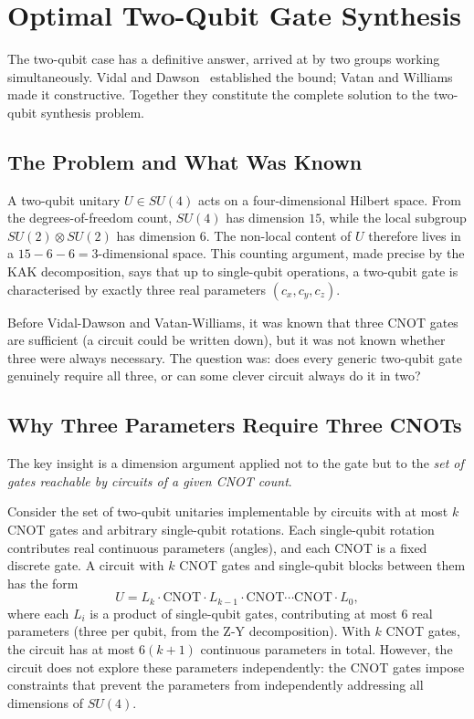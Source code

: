 \documentclass[12pt, a4paper, oneside]{report}
\theoremstyle{plain}
\theoremstyle{definition}
\theoremstyle{remark}
\newcommand{\CNOT}{\mathrm{CNOT}}
\begin{document}

\section{Optimal Two-Qubit Gate Synthesis}
\label{sec:two-qubit-opt}

The two-qubit case has a definitive answer, arrived at by two groups working
simultaneously. Vidal and Dawson~\cite{vidal2004} established the bound; Vatan and
Williams~\cite{vatan2004} made it constructive. Together they constitute the complete
solution to the two-qubit synthesis problem.

\subsection{The Problem and What Was Known}

A two-qubit unitary $U \in SU(4)$ acts on a four-dimensional Hilbert space. From the
degrees-of-freedom count, $SU(4)$ has dimension $15$, while the local subgroup
$SU(2) \otimes SU(2)$ has dimension $6$. The non-local content of $U$ therefore lives in a
$15 - 6 - 6 = 3$-dimensional space. This counting argument, made precise by the KAK
decomposition, says that up to single-qubit operations, a two-qubit gate
is characterised by exactly three real parameters $(c_x, c_y, c_z)$.

Before Vidal-Dawson and Vatan-Williams, it was known that three CNOT gates are sufficient
(a circuit could be written down), but it was not known whether three were always necessary.
The question was: does every generic two-qubit gate genuinely require all three, or can
some clever circuit always do it in two?

\subsection{Why Three Parameters Require Three CNOTs}

The key insight is a dimension argument applied not to the gate but to the \emph{set of
	gates reachable by circuits of a given CNOT count}.

Consider the set of two-qubit unitaries implementable by circuits with at most $k$ CNOT
gates and arbitrary single-qubit rotations. Each single-qubit rotation contributes real
continuous parameters (angles), and each CNOT is a fixed discrete gate. A circuit with
$k$ CNOT gates and single-qubit blocks between them has the form
\[
	U = L_k \cdot \CNOT \cdot L_{k-1} \cdot \CNOT \cdots \CNOT \cdot L_0,
\]
where each $L_i$ is a product of single-qubit gates, contributing at most $6$ real parameters
(three per qubit, from the Z-Y decomposition). With $k$ CNOT gates, the circuit has at most
$6(k+1)$ continuous parameters in total. However, the circuit does not explore these
parameters independently: the CNOT gates impose constraints that prevent the parameters
from independently addressing all dimensions of $SU(4)$.
\end{document}

